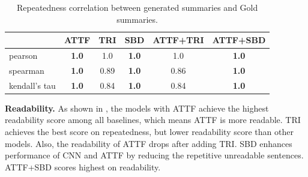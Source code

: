 \begin{table}[th!]
\scriptsize
        \centering
        \caption{Repeatedness correlation between generated summaries and Gold summaries.}
        \begin{tabular}{|l|ccccc|}
                \hline
                     & ATTF & TRI & SBD & ATTF+TRI & ATTF+SBD \\
                \hline
                pearson & \bf 1.0 & 1.0 & \bf 1.0 & 1.0 & \bf 1.0\\
			    spearman & \bf 1.0& 0.89 &\bf 1.0 & 0.86 &\bf 1.0\\
				kendall's tau & \bf 1.0 & 0.84 & \bf 1.0 & 0.84 & \bf 1.0 \\
                \hline
        \end{tabular}
        \label{tab:eval_repcor}
\end{table}

	
\textbf{Readability.}
As shown in , 
the models with ATTF achieve the
highest readability score among all baselines, 
which means ATTF is more readable.
TRI achieves the best score on repeatedness, 
but lower readability score than other models.
Also, the readability of ATTF drops after adding TRI.
SBD enhances performance of CNN and ATTF by reducing the repetitive unreadable sentences. 
ATTF+SBD scores highest on readability.


